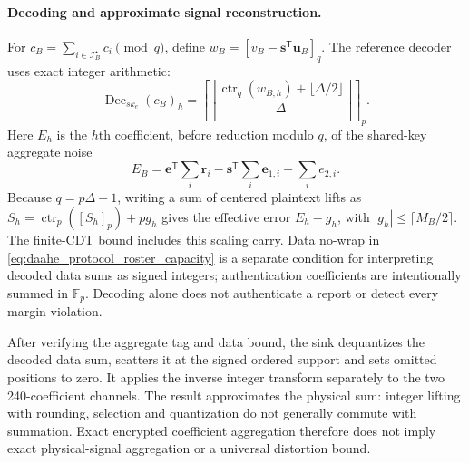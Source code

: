 \paragraph{Decoding and approximate signal reconstruction.}
For $c_B=\sum_{i\in\mathcal{I}^{\star}_B}c_i\pmod q$, define
$w_B=[v_B-\boldsymbol{s}^{\mathsf T}\boldsymbol{u}_B]_q$. The reference decoder
uses exact integer arithmetic:
\begin{equation}
 \operatorname{Dec}_{sk_e}(c_B)_h
 =\left[\left\lfloor
 \frac{\operatorname{ctr}_q(w_{B,h})+\lfloor\Delta/2\rfloor}{\Delta}
 \right\rfloor\right]_p.
 \label{eq:daahe_protocol_decoder}
\end{equation}
Here $E_h$ is the $h$th coefficient, before reduction modulo $q$, of the
shared-key aggregate noise
\begin{equation}
 E_B=\boldsymbol{e}^{\mathsf T}\sum_i\boldsymbol{r}_i
       -\boldsymbol{s}^{\mathsf T}\sum_i\boldsymbol{e}_{1,i}
       +\sum_i e_{2,i}.
 \label{eq:daahe_protocol_aggregate_noise}
\end{equation}
Because $q=p\Delta+1$, writing a sum of centered plaintext lifts as
$S_h=\operatorname{ctr}_p([S_h]_p)+p g_h$ gives the effective error
$E_h-g_h$, with $|g_h|\leq\lceil M_B/2\rceil$. The finite-CDT bound includes
this scaling carry. Data no-wrap in \eqref{eq:daahe_protocol_roster_capacity}
is a separate condition for interpreting decoded data sums as signed integers;
authentication coefficients are intentionally summed in $\mathbb{F}_p$.
Decoding alone does not authenticate a report or detect every margin violation.

After verifying the aggregate tag and data bound, the sink dequantizes the
decoded data sum, scatters it at the signed ordered support and sets omitted
positions to zero. It applies the inverse integer transform separately to the
two 240-coefficient channels. The result approximates the physical sum:
integer lifting with rounding, selection and quantization do not generally
commute with summation. Exact encrypted coefficient aggregation therefore does
not imply exact physical-signal aggregation or a universal distortion bound.

